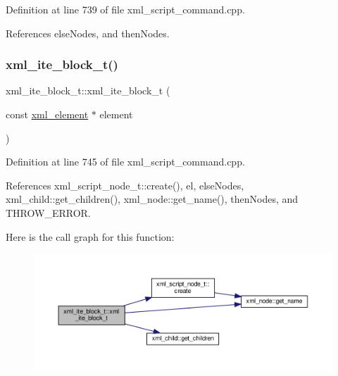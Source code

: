 Definition at line 739 of file xml\+\_\+script\+\_\+command.\+cpp.



References else\+Nodes, and then\+Nodes.

\mbox{\label{classxml__ite__block__t_ade36bd6a315c96d5c3944f8283146cc1}} 
\subsubsection{\texorpdfstring{xml\+\_\+ite\+\_\+block\+\_\+t()}{xml\_ite\_block\_t()}\hspace{0.1cm}{\footnotesize\ttfamily [2/2]}}
{\footnotesize\ttfamily xml\+\_\+ite\+\_\+block\+\_\+t\+::xml\+\_\+ite\+\_\+block\+\_\+t (\begin{DoxyParamCaption}\item[{const \hyperlink{classxml__element}{xml\+\_\+element} $\ast$}]{element }\end{DoxyParamCaption})\hspace{0.3cm}{\ttfamily [explicit]}}



Definition at line 745 of file xml\+\_\+script\+\_\+command.\+cpp.



References xml\+\_\+script\+\_\+node\+\_\+t\+::create(), el, else\+Nodes, xml\+\_\+child\+::get\+\_\+children(), xml\+\_\+node\+::get\+\_\+name(), then\+Nodes, and T\+H\+R\+O\+W\+\_\+\+E\+R\+R\+OR.

Here is the call graph for this function\+:
\nopagebreak
\begin{figure}[H]
\begin{center}
\leavevmode
\includegraphics[width=350pt]{df/d5b/classxml__ite__block__t_ade36bd6a315c96d5c3944f8283146cc1_cgraph}
\end{center}
\end{figure}
\mbox{\label{classxml__ite__block__t_afb50b8f16b557077cd0b9f31250dcb15}} 
